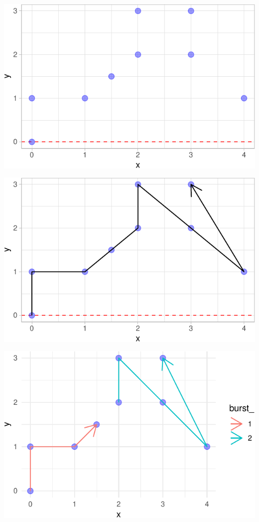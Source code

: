 \documentclass[ignorenonframetext,,t]{beamer}
\begin{document}
\begin{frame}
\begin{center}\includegraphics[width=0.85\linewidth]{01a_lecture_files/figure-beamer/unnamed-chunk-12-1} \end{center}
\end{frame}

\begin{frame}
\begin{center}\includegraphics[width=0.85\linewidth]{01a_lecture_files/figure-beamer/unnamed-chunk-13-1} \end{center}
\end{frame}

\begin{frame}
\begin{center}\includegraphics[width=0.85\linewidth]{01a_lecture_files/figure-beamer/unnamed-chunk-14-1} \end{center}
\end{frame}
\end{document}
